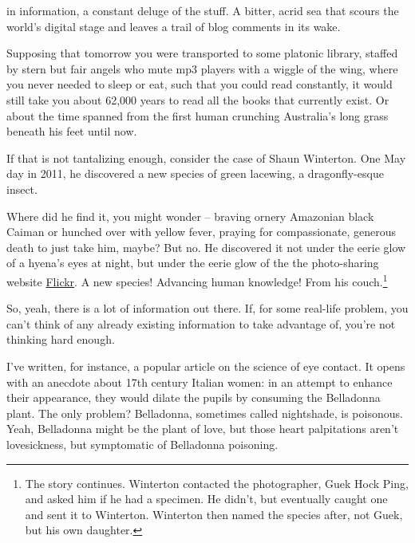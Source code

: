  in information, a constant deluge of the
stuff. A bitter, acrid sea that scours the world's digital stage and leaves a
trail of blog comments in its wake.

Supposing that tomorrow you were transported to some platonic
library, staffed
by stern but fair angels who mute mp3 players with a wiggle of the wing, where
you never needed to sleep or eat, such that you could read constantly, it would
still take you about 62,000 years to read all the books that currently
exist. Or about the time spanned from the first human crunching Australia's
long grass
beneath his feet until
now.  

If that is not tantalizing enough, consider the case of Shaun Winterton. One May day in 2011, he discovered a new species of green lacewing, a dragonfly-esque insect.

Where did he find it, you might wonder -- braving ornery Amazonian black Caiman
or hunched over with yellow fever, praying for compassionate, generous death to just take him, maybe? But no. He discovered it not under the
eerie glow of a hyena's eyes at night, but under the eerie glow of the the
photo-sharing website \href{https://www.flickr.com/}{Flickr}. A new species! Advancing human
knowledge! From his couch.\footnote{The story continues. Winterton contacted the photographer, Guek Hock Ping, and asked him
  if he had a specimen. He didn't, but eventually caught one and sent it to
  Winterton. Winterton then named the species after, not Guek, but his own daughter.}\cite{winterton2012charismatic}

So, yeah, there is a lot of information out there. If, for some real-life problem, you can't think of any already existing information to take advantage of, you're not thinking hard enough.

I've written, for instance, a popular article on the science of eye contact. It
opens with an anecdote about 17th century Italian women: in an attempt to
enhance their appearance, they would dilate the pupils by consuming the Belladonna plant. The only problem? Belladonna, sometimes called nightshade, is
poisonous. Yeah, Belladonna might be the plant of love, but those heart
palpitations aren't lovesickness, but symptomatic of Belladonna poisoning.

